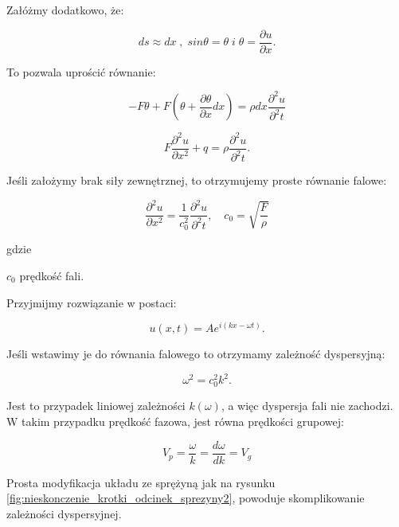 Załóżmy dodatkowo, że:

\begin{equation}
ds \approx dx\; ,\; sin\theta=\theta \; i\; \theta = \frac{\partial u}{\partial x}.
\end{equation}

To pozwala uprościć równanie:

\begin{equation}
-F\theta+F(\theta + \frac{\partial \theta}{\partial x}dx)=\rho dx\frac{\partial^2 u}{\partial^2 t}
\end{equation}

\begin{equation}
F\frac{\partial^2 u}{\partial x^2} + q = \rho \frac{\partial^2 u}{\partial^2 t}.
\end{equation}

Jeśli założymy brak siły zewnętrznej, to otrzymujemy proste równanie falowe:

\begin{equation}
\frac{\partial^2 u}{\partial x^2} = \frac{1}{c_0^2} \frac{\partial^2 u}{\partial^2 t},\quad c_0=\sqrt{\frac{F}{\rho}}
\end{equation}

gdzie
\begin{eqwhere}[2cm]
        \item[$c_0$] prędkość fali.
\end{eqwhere}

Przyjmijmy rozwiązanie w postaci:

\begin{equation}
u(x,t)=Ae^{i(kx-\omega t)}.
\end{equation}

Jeśli wstawimy je do równania falowego to otrzymamy zależność dyspersyjną:

\begin{equation}
\omega^2=c_0^2 k^2.
\end{equation}

Jest to przypadek liniowej zależności \( k(\omega)\), a więc dyspersja fali nie zachodzi. W takim przypadku prędkość fazowa, jest równa prędkości grupowej:

\begin{equation}
V_p=\frac{\omega}{k}=\frac{d\omega}{dk}=V_g
\end{equation}

Prosta modyfikacja układu ze sprężyną jak na rysunku \ref{fig:nieskonczenie_krotki_odcinek_sprezyny2}, powoduje skomplikowanie zależności dyspersyjnej.

